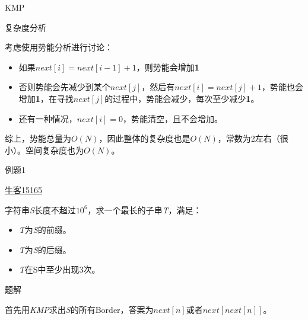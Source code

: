 \documentclass{ctexbeamer}		%
\begin{document}
\begin{frame}{KMP}
    
\begin{block}{复杂度分析}

考虑使用势能分析进行讨论：
\begin{itemize}
    \item 如果$next[i] = next[i-1] + 1$，则势能会增加\textbf{1}
    \item 否则势能会先减少到某个$next[j]$，然后有$next[i] = next[j] + 1$，势能也会增加\textbf{1}，在寻找$next[j]$的过程中，势能会减少，每次至少减少\textbf{1}。
    \item 还有一种情况，$next[i] = 0$，势能清空，且不会增加。
\end{itemize}

\hphantom{ }

综上，势能总量为$O(N)$，因此整体的复杂度也是$O(N)$，常数为2左右（很小）。空间复杂度也为$O(N)$。

\end{block}

\end{frame}

\begin{frame}{例题1}

\begin{block}{\href{https://ac.nowcoder.com/acm/problem/15165}{牛客15165}}

字符串\textit{S}长度不超过$10^6$，求一个最长的子串\textit{T}，满足：

\begin{itemize}
    \item \textit{T}为\textit{S}的前缀。
    \item \textit{T}为\textit{S}的后缀。
    \item \textit{T}在S中至少出现3次。
\end{itemize}

\end{block}

\pause

\begin{block}{题解}

首先用\textit{KMP}求出\textit{S}的所有Border，答案为$next[n]$或者$next[next[n]]$。

\end{block}
\end{frame}
\end{document}
